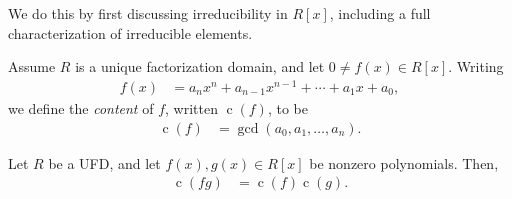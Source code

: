 \documentclass[10pt]{mypackage}
\begin{document}
We do this by first discussing irreducibility in $R[x]$, including a full characterization of irreducible elements.
\begin{definition}
  Assume $R$ is a unique factorization domain, and let $0\neq f(x)\in R[x]$. Writing
  \begin{align*}
    f(x) &= a_nx^n + a_{n-1}x^{n-1} + \cdots + a_1 x + a_0,
  \end{align*}
  we define the \textit{content} of $f$, written $\operatorname{c}(f)$, to be
  \begin{align*}
    \operatorname{c}(f) &= \operatorname{gcd}\left( a_0,a_1,\dots,a_n \right).
  \end{align*}
\end{definition}
\begin{proposition}
  Let $R$ be a UFD, and let $f(x),g(x)\in R[x]$ be nonzero polynomials. Then,
  \begin{align*}
    \operatorname{c}\left( f g \right) &= \operatorname{c}\left( f \right)\operatorname{c}\left( g \right).
  \end{align*}
\end{proposition}
\end{document}
